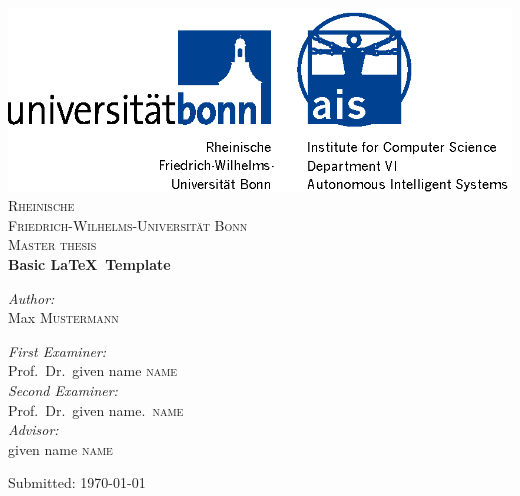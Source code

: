 \documentclass[12pt, %
               a4paper, %
               twoside, %
               openright, %
               abstract=on, %
               DIV=11,      %
               BCOR=8mm]{scrbook} %
\begin{document}
\frontmatter

\begin{titlepage}
\begin{center}

\includegraphics{logo2}\\[1cm]

\textsc{\LARGE Rheinische\\[5mm] Friedrich-Wilhelms-Universität Bonn}\\[1.5cm]

\textsc{\Large Master thesis}\\[1.5cm]

{ \Large \bfseries Basic \LaTeX \, Template }\\[1.4cm]

\begin{minipage}[t]{0.4\textwidth}
\begin{flushleft} \large
\emph{Author:}\\
Max \textsc{Mustermann}
\end{flushleft}
\end{minipage}
\begin{minipage}[t]{0.5\textwidth}
\begin{flushright} \large
\emph{First Examiner:} \\
Prof.~Dr.~given name \textsc{name} \\[0.5cm]
\emph{Second Examiner:} \\
Prof.~Dr.~given name.~\textsc{name} \\[0.5cm]

\emph{Advisor:} \\
given name \textsc{name} \\[0.5cm]
\end{flushright}
\end{minipage}

\vfill

{\large Submitted:\hspace{1cm} \today}

\end{center}
\end{titlepage}
\end{document}
